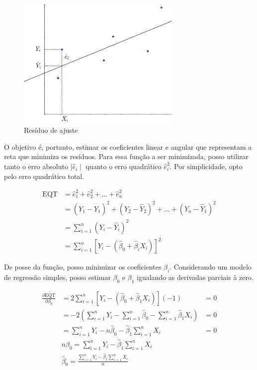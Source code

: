 \documentclass[
  12pt,
  letterpaper,
  DIV=11,
  numbers=noendperiod]{scrartcl}
\begin{document}
\begin{figure}

{\centering \includegraphics[width=0.7\textwidth,height=\textheight]{img/appendix_b_1.png}

}

\caption{Resíduo de ajuste}

\end{figure}

O objetivo é, portanto, estimar os coeficientes linear e angular que
representam a reta que minimiza os resíduos. Para essa função a ser
minimizada, posso utilizar tanto o erro absoluto \(\mid \hat{e}_i \mid\)
quanto o erro quadrático \(\hat{e}_i^2\). Por simplicidade, opto pelo
erro quadrático total.

\begin{equation}
\begin{aligned}
\text{EQT} & = \hat{e}^2_1 + \hat{e}^2_2 + ... + \hat{e}^2_n \\
& = (Y_1 - \hat{Y}_1)^2 + (Y_2 - \hat{Y}_2)^2 + ... + (Y_n - \hat{Y}_1)^2 \\
& = \sum_{i=1}^{n}(Y_i - \hat{Y}_i)^2 \\
& = \sum_{i=1}^{n}[Y_i - (\hat{\beta}_0 + \hat{\beta}_iX_i)]^2
\end{aligned}
\end{equation}

De posse da função, posso minimizar os coeficientes \(\beta_i\).
Considerando um modelo de regressão simples, posso estimar \(\beta_0\) e
\(\beta_1\) igualando as derivadas parciais à zero.

\begin{equation}
\begin{aligned}
\frac{\partial \text{EQT}}{\partial \beta_0} & = 2\sum_{i=1}^{n}[Y_i - (\hat{\beta}_0 + \hat{\beta}_1X_i)] (-1) & = 0 \\
& = -2 (\sum_{i=1}^{n} Y_i - \sum_{i=1}^{n} \hat{\beta}_0 - \sum_{i=1}^{n} \hat{\beta}_1X_i) & = 0 \\
& = \sum_{i=1}^{n} Y_i - n\hat{\beta}_0 - \hat{\beta}_1 \sum_{i=1}^{n} X_i & = 0 \\
& n\hat{\beta}_0 = \sum_{i=1}^{n} Y_i - \hat{\beta}_1 \sum_{i=1}^{n} X_i \\
& \hat{\beta}_0 = \frac{\sum_{i=1}^{n} Y_i - \hat{\beta}_1 \sum_{i=1}^{n} X_i}{n}
\end{aligned}
\end{equation}
\end{document}
